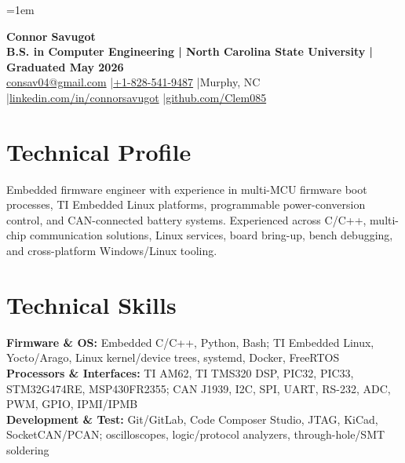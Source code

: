 \documentclass[10pt,letterpaper]{article}
\begin{document}
\fontsize{9.8}{10.72}\selectfont
\setlength{\RaggedRightRightskip}{0pt plus 5em}
\RaggedRight
\emergencystretch=1em

\begin{center}
  {\fontsize{21.5}{22.2}\selectfont\bfseries Connor Savugot}\\[1.5pt]
  {\bfseries B.S. in Computer Engineering | North Carolina State University | Graduated May 2026}\\[1.5pt]
  {\fontsize{9.6}{10.2}\selectfont
    \href{mailto:consav04@gmail.com}{consav04@gmail.com}
    \enspace|\enspace \href{tel:+18285419487}{+1-828-541-9487}
    \enspace|\enspace Murphy, NC
    \enspace|\enspace \href{https://linkedin.com/in/connorsavugot}{linkedin.com/in/connorsavugot}
    \enspace|\enspace \href{https://github.com/Clem085}{github.com/Clem085}}
\end{center}
\vspace{-0.18cm}

\section{Technical Profile}
Embedded firmware engineer with experience in multi-MCU firmware boot processes, TI Embedded Linux platforms, programmable power-conversion control, and CAN-connected battery systems. Experienced across C/C++, multi-chip communication solutions, Linux services, board bring-up, bench debugging, and cross-platform Windows/Linux tooling.

\section{Technical Skills}
\textbf{Firmware \& OS:} Embedded C/C++, Python, Bash; TI Embedded Linux, Yocto/Arago, Linux kernel/device trees, systemd, Docker, FreeRTOS\\
\textbf{Processors \& Interfaces:} TI AM62, TI TMS320 DSP, PIC32, PIC33, STM32G474RE, MSP430FR2355; CAN J1939, I2C, SPI, UART, RS-232, ADC, PWM, GPIO, IPMI/IPMB\\
\textbf{Development \& Test:} Git/GitLab, Code Composer Studio, JTAG, KiCad, SocketCAN/PCAN; oscilloscopes, logic/protocol analyzers, through-hole/SMT soldering
\end{document}
